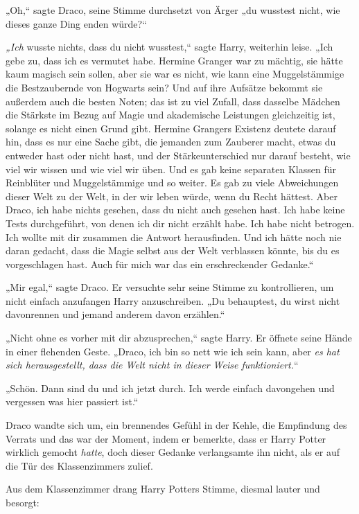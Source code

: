 {„Oh,“ sagte Draco, seine Stimme durchsetzt von Ärger „du wusstest nicht, wie dieses ganze Ding enden würde?“

\emph{„Ich} wusste nichts, dass du nicht wusstest,“ sagte Harry, weiterhin leise. „Ich gebe zu, dass ich es vermutet habe. Hermine Granger war zu mächtig, sie hätte kaum magisch sein sollen, aber sie war es nicht, wie kann eine Muggelstämmige die Bestzaubernde von Hogwarts sein? Und auf ihre Aufsätze bekommt sie außerdem auch die besten Noten; das ist zu viel Zufall, dass dasselbe Mädchen die Stärkste im Bezug auf Magie und akademische Leistungen gleichzeitig ist, solange es nicht einen Grund gibt. Hermine Grangers Existenz deutete darauf hin, dass es nur eine Sache gibt, die jemanden zum Zauberer macht, etwas du entweder hast oder nicht hast, und der Stärkeunterschied nur darauf besteht, wie viel wir wissen und wie viel wir üben. Und es gab keine separaten Klassen für Reinblüter und Muggelstämmige und so weiter. Es gab zu viele Abweichungen dieser Welt zu der Welt, in der wir leben würde, wenn du Recht hättest. Aber Draco, ich habe nichts gesehen, dass du nicht auch gesehen hast. Ich habe keine Tests durchgeführt, von denen ich dir nicht erzählt habe. Ich habe nicht betrogen. Ich wollte mit dir zusammen die Antwort herausfinden. Und ich hätte noch nie daran gedacht, dass die Magie selbst aus der Welt verblassen könnte, bis du es vorgeschlagen hast. Auch für mich war das ein erschreckender Gedanke.“

„Mir egal,“ sagte Draco. Er versuchte sehr seine Stimme zu kontrollieren, um nicht einfach anzufangen Harry anzuschreiben. „Du behauptest, du wirst nicht davonrennen und jemand anderem davon erzählen.“

„Nicht ohne es vorher mit dir abzusprechen,“ sagte Harry. Er öffnete seine Hände in einer flehenden Geste. „Draco, ich bin so nett wie ich sein kann, aber \emph{es hat sich herausgestellt, dass die Welt nicht in dieser Weise funktioniert.}“

„Schön. Dann sind du und ich jetzt durch. Ich werde einfach davongehen und vergessen was hier passiert ist.“

Draco wandte sich um, ein brennendes Gefühl in der Kehle, die Empfindung des Verrats und das war der Moment, indem er bemerkte, dass er Harry Potter wirklich gemocht \emph{hatte}, doch dieser Gedanke verlangsamte ihn nicht, als er auf die Tür des Klassenzimmers zulief.

Aus dem Klassenzimmer drang Harry Potters Stimme, diesmal lauter und besorgt:

}
